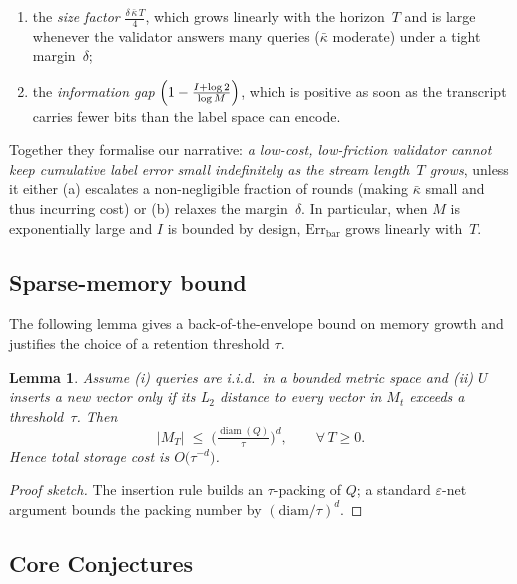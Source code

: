 \documentclass[11pt]{article}
\newcommand{\Err}{\mathrm{Err}}
\newcommand{\kappabar}{\bar{\kappa}}
\newtheorem{lemma}{Lemma}
\begin{document}
\begin{enumerate}[label=(\roman*)]
\item the \emph{size factor} $\displaystyle\frac{\delta\,\kappabar\,T}{4}$,
      which grows linearly with the horizon~$T$ and is large whenever
      the validator answers many queries ($\kappabar$ moderate) under a
      tight margin~$\delta$;
\item the \emph{information gap}
      $\displaystyle\Bigl(1-\tfrac{I+\log 2}{\log M}\Bigr)$,
      which is positive as soon as the transcript carries fewer bits
      than the label space can encode.
\end{enumerate}
Together they formalise our narrative: \emph{a low-cost, low-friction
validator cannot keep cumulative label error small indefinitely as the
stream length~$T$ grows}, unless it either (a) escalates a non-negligible
fraction of rounds (making $\kappabar$ small and thus incurring cost) or
(b) relaxes the margin~$\delta$.  In particular, when $M$ is
exponentially large and $I$ is bounded by design, $\Err_{\mathrm{bar}}$
grows linearly with~$T$.





\subsection{Sparse-memory bound}
\label{sec:sparse-memory-bound}

The following lemma gives a back-of-the-envelope bound on memory growth and justifies the choice of a retention threshold $\tau$.

\begin{lemma}
\label{lemma}
Assume (i) queries are i.i.d.\ in a bounded metric space
and (ii)  $U$ inserts a new vector only if its L$_2$ distance to every
vector in $M_t$ exceeds a threshold~$\tau$.  Then
\[
  |M_T| \;\le\;
  \bigl(\tfrac{\operatorname{diam}(Q)}{\tau}\bigr)^{d},
  \qquad
  \forall\,T\ge 0 .
\]
Hence total storage cost is $O\!\bigl(\tau^{-d}\bigr)$.
\end{lemma}

\begin{proof}[Proof sketch]
The insertion rule builds an $\tau$-packing of $Q$; a standard $\varepsilon$-net
argument bounds the packing number by $(\mathrm{diam}/\tau)^d$.
\end{proof}

\subsection{Core Conjectures}
\label{sec:conjectures}
\end{document}
